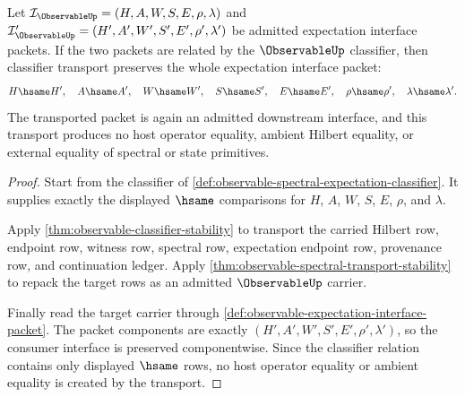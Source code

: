 \begin{theorem}
\label{thm:observable-expectation-transport-exactness}
Let
$\mathcal{I}_{\ObservableUp}=(H,A,W,S,E,\rho,\lambda)$ and
$\mathcal{I}'_{\ObservableUp}=(H',A',W',S',E',\rho',\lambda')$ be admitted
expectation interface packets. If the two packets are related by the
$\ObservableUp$ classifier, then classifier transport preserves the whole
expectation interface packet:
$$
H\hsame H',\quad A\hsame A',\quad W\hsame W',\quad S\hsame S',
\quad E\hsame E',\quad \rho\hsame\rho',\quad \lambda\hsame\lambda'.
$$
The transported packet is again an admitted downstream interface, and this
transport produces no host operator equality, ambient Hilbert equality, or
external equality of spectral or state primitives.
\end{theorem}
\begin{proof}
Start from the classifier of
\autoref{def:observable-spectral-expectation-classifier}. It supplies
exactly the displayed $\hsame$ comparisons for $H$, $A$, $W$, $S$, $E$,
$\rho$, and $\lambda$.

Apply \autoref{thm:observable-classifier-stability} to transport the carried
Hilbert row, endpoint row, witness row, spectral row, expectation endpoint
row, provenance row, and continuation ledger. Apply
\autoref{thm:observable-spectral-transport-stability} to repack the target
rows as an admitted $\ObservableUp$ carrier.

Finally read the target carrier through
\autoref{def:observable-expectation-interface-packet}. The packet components
are exactly $(H',A',W',S',E',\rho',\lambda')$, so the consumer interface is
preserved componentwise. Since the classifier relation contains only
displayed $\hsame$ rows, no host operator equality or ambient equality is
created by the transport.
\end{proof}

